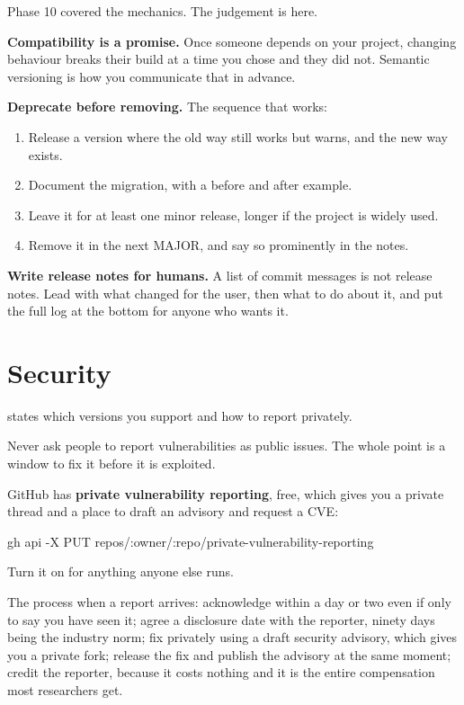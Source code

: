 \documentclass[11pt]{article}
\begin{document}
Phase 10 covered the mechanics. The judgement is here.

\textbf{Compatibility is a promise.} Once someone depends on your project, changing
behaviour breaks their build at a time you chose and they did not. Semantic versioning
is how you communicate that in advance.

\textbf{Deprecate before removing.} The sequence that works:

\begin{enumerate}
  \item Release a version where the old way still works but warns, and the new way
    exists.
  \item Document the migration, with a before and after example.
  \item Leave it for at least one minor release, longer if the project is widely used.
  \item Remove it in the next MAJOR, and say so prominently in the notes.
\end{enumerate}

\textbf{Write release notes for humans.} A list of commit messages is not release
notes. Lead with what changed for the user, then what to do about it, and put the
full log at the bottom for anyone who wants it.

\section{Security}

 states which versions you support and how to report privately.

\begin{trap}
Never ask people to report vulnerabilities as public issues. The whole point is a
window to fix it before it is exploited.

GitHub has \textbf{private vulnerability reporting}, free, which gives you a private
thread and a place to draft an advisory and request a CVE:

\begin{shell}
gh api -X PUT repos/:owner/:repo/private-vulnerability-reporting
\end{shell}

Turn it on for anything anyone else runs.
\end{trap}

The process when a report arrives: acknowledge within a day or two even if only to
say you have seen it; agree a disclosure date with the reporter, ninety days being the
industry norm; fix privately using a draft security advisory, which gives you a
private fork; release the fix and publish the advisory at the same moment; credit the
reporter, because it costs nothing and it is the entire compensation most researchers
get.
\end{document}
